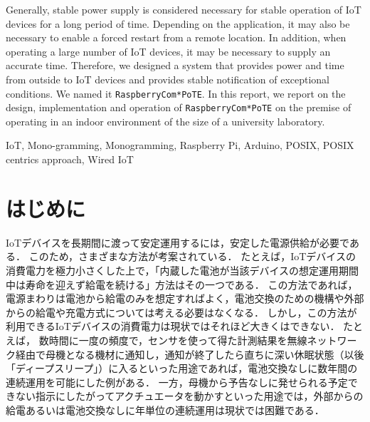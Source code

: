 \begin{eabstract}
Generally, stable power supply is considered necessary for stable operation of IoT devices for a long period of time.
Depending on the application, it may also be necessary to enable a forced restart from a remote location.
In addition, when operating a large number of IoT devices, it may be necessary to supply an accurate time.
Therefore, we designed a system that provides power and time from outside to IoT devices and provides stable notification of exceptional conditions. We named it {\tt Raspberry\-Com*PoTE}.
In this report, we report on the design, implementation and operation of {\tt Raspberry\-Com*PoTE} on the premise of operating in an indoor environment of the size of a university laboratory.

\end{eabstract}

\begin{ekeyword}
IoT, Mono-gramming, Monogramming, Raspberry Pi, Arduino, POSIX, POSIX centrics approach, Wired IoT
\end{ekeyword}

\maketitle




\section{はじめに}
\label{sec:01introduction}

IoTデバイスを長期間に渡って安定運用するには，安定した電源供給が必要である．
このため，さまざまな方法が考案されている．
たとえば，IoTデバイスの消費電力を極力小さくした上で，「内蔵した電池が当該デバイスの想定運用期間中は寿命を迎えず給電を続ける」方法はその一つである．
この方法であれば，電源まわりは電池から給電のみを想定すればよく，電池交換のための機構や外部からの給電や充電方式については考える必要はなくなる．
しかし，この方法が利用できるIoTデバイスの消費電力は現状ではそれほど大きくはできない．
たとえば，
数時間に一度の頻度で，センサを使って得た計測結果を無線ネットワーク経由で母機となる機材に通知し，通知が終了したら直ちに深い休眠状態（以後「ディープスリープ」）に入るといった用途であれば，電池交換なしに数年間の連続運用を可能にした例がある．
一方，母機から予告なしに発せられる予定できない指示にしたがってアクチュエータを動かすといった用途では，外部からの給電あるいは電池交換なしに年単位の連続運用は現状では困難である．

